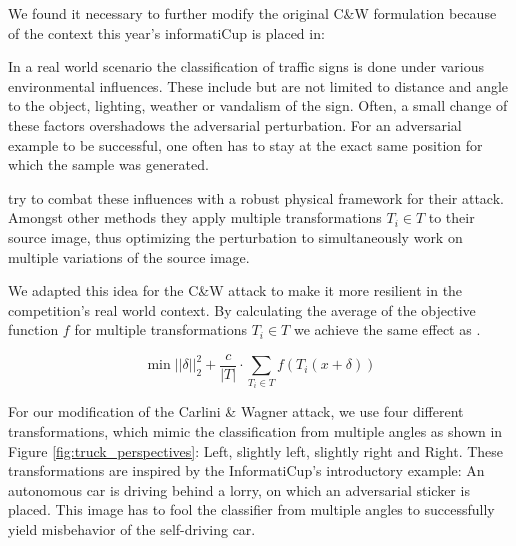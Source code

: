 We found it necessary to further modify the original C\&W formulation because of the context this year's informatiCup is placed in:

In a real world scenario the classification of traffic signs is done under various environmental influences.
These include but are not limited to distance and angle to the object, lighting, weather or vandalism of the sign.
Often, a small change of these factors overshadows the adversarial perturbation. %
For an adversarial example to be successful, one often has to stay at the exact same position for which the sample was generated. 

\citet{eykholt2018robust} try to combat these influences with a robust physical framework for their attack.
Amongst other methods they apply multiple transformations $T_i \in T$ to their source image,
thus optimizing the perturbation to simultaneously work on multiple variations of the source image.

We adapted this idea for the C\&W attack to make it more resilient in the competition's real world context. By calculating the average of the objective function $f$ for multiple transformations $T_i \in T$ we achieve the same effect as \cite{eykholt2018robust}.

\begin{equation}
\min ||\delta||^2_2 + \frac{c}{|T|} \cdot \sum_{T_i \in T} f(T_i(x + \delta))
\end{equation}

For our modification of the Carlini \& Wagner attack, we use four different transformations,
which mimic the classification from multiple angles as shown in Figure \ref{fig:truck_perspectives}: Left, slightly left, slightly right and Right.
These transformations are inspired by the InformatiCup's introductory example:
An autonomous car is driving behind a lorry, on which an adversarial sticker is placed.
This image has to fool the classifier from multiple angles to successfully yield misbehavior of the self-driving car.

